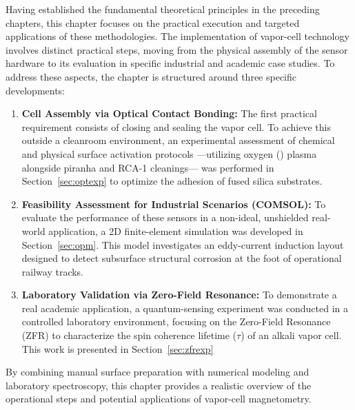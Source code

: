 \label{chap:applications}
Having established the fundamental theoretical principles in the preceding 
chapters, this chapter focuses on the practical execution and targeted 
applications of these methodologies. The implementation of vapor-cell 
technology involves distinct practical steps, moving from the physical 
assembly of the sensor hardware to its evaluation in specific industrial and 
academic case studies. To address these aspects, the chapter is structured around three specific 
developments:

\begin{enumerate}
    \item \textbf{Cell Assembly via Optical Contact Bonding:} The first 
    practical requirement consists of closing and sealing the vapor cell. 
    To achieve this outside a cleanroom environment, an experimental 
    assessment of chemical and physical surface activation protocols ---utilizing 
    oxygen () plasma alongside piranha and RCA-1 cleanings--- was 
    performed in Section~\ref{sec:optexp} to optimize the adhesion of fused silica substrates.
    
    \item \textbf{Feasibility Assessment for Industrial Scenarios (COMSOL):} 
    To evaluate the performance of these sensors in a non-ideal, unshielded 
    real-world application, a 2D finite-element simulation was developed in Section~\ref{sec:opm}. This 
    model investigates an eddy-current induction layout designed to detect 
    subsurface structural corrosion at the foot of operational railway tracks.
    
    \item \textbf{Laboratory Validation via Zero-Field Resonance:} To demonstrate 
    a real academic application, a quantum-sensing experiment 
    was conducted in a controlled laboratory environment, focusing on the 
    Zero-Field Resonance (ZFR) to characterize the spin coherence 
    lifetime ($\tau$) of an alkali vapor cell. This work is presented in
    Section~\ref{sec:zfrexp}
\end{enumerate}

By combining manual surface preparation with numerical modeling and laboratory 
spectroscopy, this chapter provides a realistic overview of the operational 
steps and potential applications of vapor-cell magnetometry.